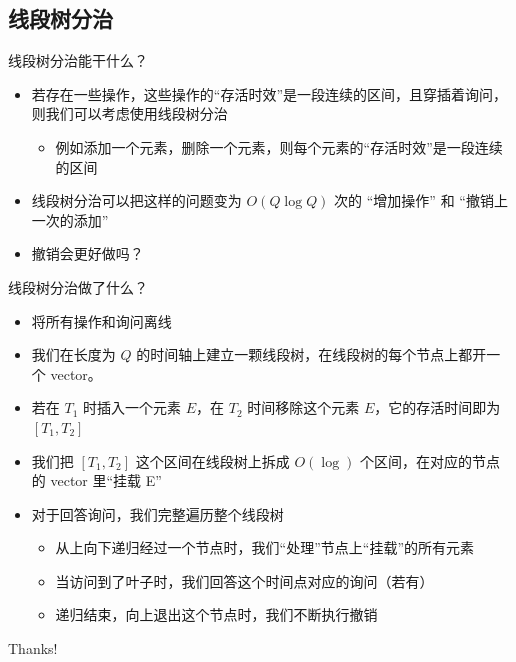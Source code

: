 ﻿\documentclass[aspectratio=169,handout]{ctexbeamer}
\begin{document}
\subsection{线段树分治}

\begin{frame}{线段树分治能干什么？}
    \begin{itemize}
        \item 若存在一些操作，这些操作的“存活时效”是一段连续的区间，且穿插着询问，则我们可以考虑使用线段树分治
        \begin{itemize}
            \item 例如添加一个元素，删除一个元素，则每个元素的“存活时效”是一段连续的区间
        \end{itemize}
        \item 线段树分治可以把这样的问题变为 $O(Q\log Q)$ 次的 “增加操作” 和 “撤销上一次的添加”
        \item 撤销会更好做吗？ 
    \end{itemize}
\end{frame}

\begin{frame}{线段树分治做了什么？}
    \begin{itemize}
        \item 将所有操作和询问离线
        \item 我们在长度为 $Q$ 的时间轴上建立一颗线段树，在线段树的\textcolor{peaking}{每个}节点上都开一个 vector。
        \item 若在 $T_1$ 时插入一个元素 $E$，在 $T_2$ 时间移除这个元素 $E$，它的存活时间即为 $[T_1,T_2]$
        \item 我们把 $[T_1,T_2]$ 这个区间在线段树上拆成 $O(\log)$ 个区间，在对应的节点的 vector 里“挂载 E”
        \item 对于回答询问，我们完整遍历整个线段树
        \begin{itemize}
            \item 从上向下递归经过一个节点时，我们“处理”节点上“挂载”的所有元素
            \item 当访问到了叶子时，我们回答这个时间点对应的询问（若有）
            \item 递归结束，向上退出这个节点时，我们不断执行撤销
        \end{itemize}
    \end{itemize}
\end{frame}












\begin{frame}
    \begin{center}
        {\Huge\calligra Thanks!}
    \end{center}
\end{frame}
\end{document}
